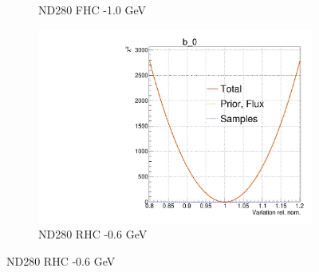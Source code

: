 \begin{figure}[h]
\begin{subfigure}[t]{0.32\textwidth}
		\caption{ND280 FHC -1.0 GeV}
	\end{subfigure}
	\begin{subfigure}[t]{0.32\textwidth}
		\includegraphics[width=\textwidth, trim={0mm 0mm 0mm 11mm}, clip,page=30]{figures/mach3/2018/llh/tryBinningNumber6_after_fit_asimov_asimov_ND280logL_scan}
		\caption{ND280 RHC -0.6 GeV}
	\end{subfigure}
	

\end{figure}

